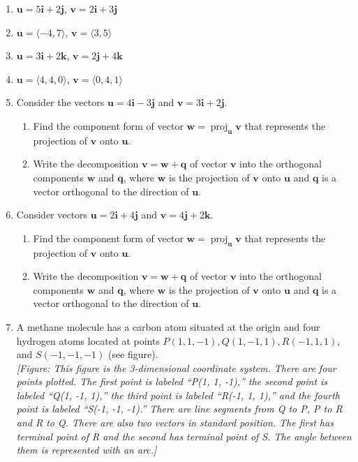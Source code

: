 \documentclass{exercises}
\begin{document}
\begin{enumerate}[resume]
\item $\mathbf{u}=5\mathbf{i}+2\mathbf{j}$, $\mathbf{v}=2\mathbf{i}+3\mathbf{j}$
\item $\mathbf{u}=\langle-4,7\rangle$, $\mathbf{v}=\langle3,5\rangle$
\item $\mathbf{u}=3\mathbf{i}+2\mathbf{k}$, $\mathbf{v}=2\mathbf{j}+4\mathbf{k}$
\item $\mathbf{u}=\langle4,4,0\rangle$, $\mathbf{v}=\langle0,4,1\rangle$
\item Consider the vectors $\mathbf{u}=4\mathbf{i}-3\mathbf{j}$ and $\mathbf{v}=3\mathbf{i}+2\mathbf{j}$.
\begin{enumerate}[label=(\alph*)]
  \item Find the component form of vector $\mathbf{w}=\operatorname{proj}_{\mathbf{u}}\mathbf{v}$ that represents the projection of $\mathbf{v}$ onto $\mathbf{u}$.
  \item Write the decomposition $\mathbf{v}=\mathbf{w}+\mathbf{q}$ of vector $\mathbf{v}$ into the orthogonal components $\mathbf{w}$ and $\mathbf{q}$, where $\mathbf{w}$ is the projection of $\mathbf{v}$ onto $\mathbf{u}$ and $\mathbf{q}$ is a vector orthogonal to the direction of $\mathbf{u}$.
\end{enumerate}
\item Consider vectors $\mathbf{u}=2\mathbf{i}+4\mathbf{j}$ and $\mathbf{v}=4\mathbf{j}+2\mathbf{k}$.
\begin{enumerate}[label=(\alph*)]
  \item Find the component form of vector $\mathbf{w}=\operatorname{proj}_{\mathbf{u}}\mathbf{v}$ that represents the projection of $\mathbf{v}$ onto $\mathbf{u}$.
  \item Write the decomposition $\mathbf{v}=\mathbf{w}+\mathbf{q}$ of vector $\mathbf{v}$ into the orthogonal components $\mathbf{w}$ and $\mathbf{q}$, where $\mathbf{w}$ is the projection of $\mathbf{v}$ onto $\mathbf{u}$ and $\mathbf{q}$ is a vector orthogonal to the direction of $\mathbf{u}$.
\end{enumerate}
\item A methane molecule has a carbon atom situated at the origin and four hydrogen atoms located at points $P(1,1,-1),Q(1,-1,1),R(-1,1,1)$, and $S(-1,-1,-1)$ (see figure). \\ \textit{[Figure: This figure is the 3-dimensional coordinate system. There are four points plotted. The first point is labeled ``P(1, 1, -1),'' the second point is labeled ``Q(1, -1, 1),'' the third point is labeled ``R(-1, 1, 1),'' and the fourth point is labeled ``S(-1, -1, -1).'' There are line segments from Q to P, P to R and R to Q. There are also two vectors in standard position. The first has terminal point of R and the second has terminal point of S. The angle between them is represented with an arc.]}

\end{enumerate}
\end{document}
